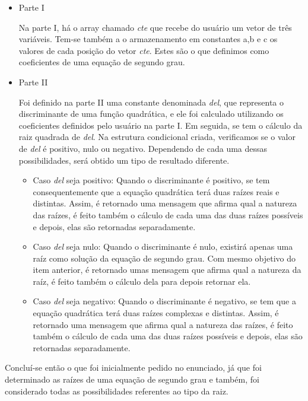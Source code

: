 \documentclass[12pt]{article}
\begin{document}
\begin{itemize}
    \item Parte I
   
    Na parte I, há o array chamado \emph{cte} que recebe do usuário um vetor de três variáveis. Tem-se também a o armazenamento em 
    constantes a,b e c os valores de cada posição do vetor \emph{cte}. Estes são o que definimos como coeficientes de uma equação de segundo grau.

    \item Parte II 
    
    Foi definido na parte II uma constante denominada \emph{del}, que representa o discriminante de uma função quadrática, e ele foi calculado utilizando
    os coeficientes definidos pelo usuário na parte I. Em seguida, se tem o cálculo da raiz quadrada de \emph{del}.
    Na estrutura condicional criada, verificamos se o valor de \emph{del} é positivo, nulo ou negativo. Dependendo de cada uma dessas possibilidades, será obtido
    um tipo de resultado diferente.
    \begin{itemize}
        \item Caso \emph{del} seja positivo:
        Quando o discriminante é positivo, se tem consequentemente que a equação quadrática terá duas raízes reais e distintas. Assim, 
        é retornado uma mensagem que afirma qual a natureza das raízes, é feito também o cálculo de cada uma das duas raízes possíveis 
        e depois, elas são retornadas separadamente.

        \item Caso \emph{del} seja nulo:
        Quando o discriminante é nulo, existirá apenas uma raíz como solução da equação de segundo grau. Com mesmo objetivo do item 
        anterior, é retornado umas mensagem que afirma qual a natureza da raíz, é feito também o cálculo dela para depois retornar ela.
        
        \item Caso \emph{del} seja negativo:
        Quando o discriminante é negativo, se tem  que a equação quadrática terá duas raízes complexas e distintas. Assim, 
        é retornado uma mensagem que afirma qual a natureza das raízes, é feito também o cálculo de cada uma das duas raízes possíveis 
        e depois, elas são retornadas separadamente.
    \end{itemize}
\end{itemize}

Concluí-se então o que foi inicialmente pedido no enunciado, já que foi determinado as raízes de uma equação de segundo grau e também,
foi considerado todas as possibilidades referentes ao tipo da raiz.
\end{document}
